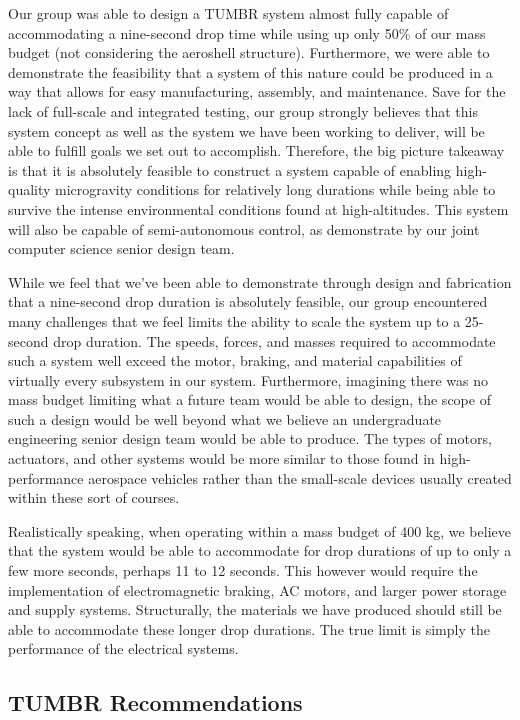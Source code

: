 \indent\indent Our group was able to design a TUMBR system almost fully capable of accommodating a nine-second drop time while using up only 50\% of our mass budget (not considering the aeroshell structure). Furthermore, we were able to demonstrate the feasibility that a system of this nature could be produced in a way that allows for easy manufacturing, assembly, and maintenance. Save for the lack of full-scale and integrated testing, our group strongly believes that this system concept as well as the system we have been working to deliver, will be able to fulfill goals we set out to accomplish. Therefore, the big picture takeaway is that it is absolutely feasible to construct a system capable of enabling high-quality microgravity conditions for relatively long durations while being able to survive the intense environmental conditions found at high-altitudes. This system will also be capable of semi-autonomous control, as demonstrate by our joint computer science senior design team. 

While we feel that we've been able to demonstrate through design and fabrication that a nine-second drop duration is absolutely feasible, our group encountered many challenges that we feel limits the ability to scale the system up to a 25-second drop duration. The speeds, forces, and masses required to accommodate such a system well exceed the motor, braking, and material capabilities of virtually every subsystem in our system. Furthermore, imagining there was no mass budget limiting what a future team would be able to design, the scope of such a design would be well beyond what we believe an undergraduate engineering senior design team would be able to produce. The types of motors, actuators, and other systems would be more similar to those found in high-performance aerospace vehicles rather than the small-scale devices usually created within these sort of courses. 

Realistically speaking, when operating within a mass budget of 400 kg, we believe that the system would be able to accommodate for drop durations of up to only a few more seconds, perhaps 11 to 12 seconds. This however would require the implementation of electromagnetic braking, AC motors, and larger power storage and supply systems. Structurally, the materials we have produced should still be able to accommodate these longer drop durations. The true limit is simply the performance of the electrical systems. 

\subsection*{TUMBR Recommendations}

